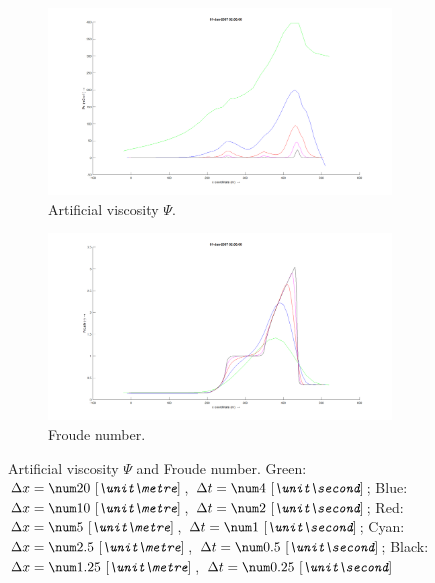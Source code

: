 %
\begin{figure}[H]
    \begin{subfigure}{0.5\textwidth}
        \includegraphics[width=\textwidth]{figures/weir_psi.png}
        \caption{Artificial viscosity $\Psi$.}
    \end{subfigure}
    \begin{subfigure}{0.5\textwidth}
        \includegraphics[width=\textwidth]{figures/weir_froude.png}
        \caption{Froude number.}
    \end{subfigure}
    \caption[Weir experiment: Artificial viscosity $\Psi$ and Froude number]{Artificial viscosity $\Psi$ and Froude number. Green: $\Dx = \bqty{20}{\metre}$, $\Dt = \bqty{4}{\second}$;
        Blue: $\Dx = \bqty{10}{\metre}$, $\Dt = \bqty{2}{\second}$;
        Red: $\Dx = \bqty{5}{\metre}$, $\Dt = \bqty{1}{\second}$;
        Cyan: $\Dx = \bqty{2.5}{\metre}$, $\Dt = \bqty{0.5}{\second}$;
        Black: $\Dx = \bqty{1.25}{\metre}$, $\Dt =\bqty{0.25}{\second}$
    }
\end{figure}

